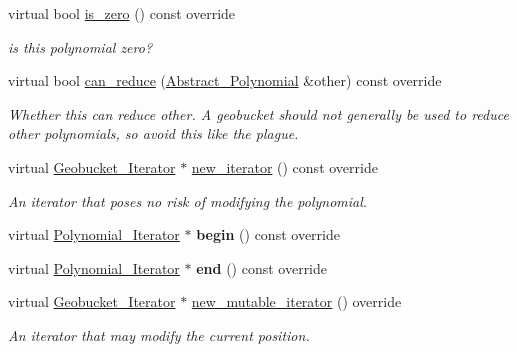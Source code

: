 \begin{Indent}
\begin{DoxyCompactItemize}
virtual bool \hyperlink{group__polygroup_ac71d7f640ebdf764c5b81bf8d9a5686d}{is\+\_\+zero} () const override
\begin{DoxyCompactList}\small\item\em is this polynomial zero? \end{DoxyCompactList}\item 
\mbox{\label{group__polygroup_af6fc5e1931972bd9e5f296ca719a1815}} 
virtual bool \hyperlink{group__polygroup_af6fc5e1931972bd9e5f296ca719a1815}{can\+\_\+reduce} (\hyperlink{group__polygroup_class_abstract___polynomial}{Abstract\+\_\+\+Polynomial} \&other) const override
\begin{DoxyCompactList}\small\item\em Whether {\ttfamily this} can reduce {\ttfamily other}. A geobucket should not generally be used to reduce other polynomials, so avoid this like the plague. \end{DoxyCompactList}\item 
\mbox{\label{group__polygroup_a08a6bd3fd143c05e1b2762a7f239b371}} 
virtual \hyperlink{group___iterator_group_class_geobucket___iterator}{Geobucket\+\_\+\+Iterator} $\ast$ \hyperlink{group__polygroup_a08a6bd3fd143c05e1b2762a7f239b371}{new\+\_\+iterator} () const override
\begin{DoxyCompactList}\small\item\em An iterator that poses no risk of modifying the polynomial. \end{DoxyCompactList}\item 
\mbox{\label{group__polygroup_a0c5f05f041e6d2c462d1dcb2bdd39df0}} 
virtual \hyperlink{group___iterator_group_class_polynomial___iterator}{Polynomial\+\_\+\+Iterator} $\ast$ {\bfseries begin} () const override
\item 
\mbox{\label{group__polygroup_a28dde5c7941ad0636f17054cd80bbd8e}} 
virtual \hyperlink{group___iterator_group_class_polynomial___iterator}{Polynomial\+\_\+\+Iterator} $\ast$ {\bfseries end} () const override
\item 
\mbox{\label{group__polygroup_a630c245914a9235dd84af2b34deb778d}} 
virtual \hyperlink{group___iterator_group_class_geobucket___iterator}{Geobucket\+\_\+\+Iterator} $\ast$ \hyperlink{group__polygroup_a630c245914a9235dd84af2b34deb778d}{new\+\_\+mutable\+\_\+iterator} () override
\begin{DoxyCompactList}\small\item\em An iterator that may modify the current position. \end{DoxyCompactList}\end{DoxyCompactItemize}
\end{Indent}
